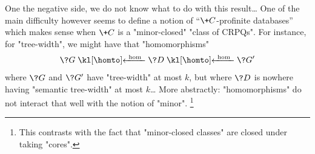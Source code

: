 One the negative side, we do not know what to do with this result…
One of the main difficulty however seems to define a notion of
``$\+C$-profinite databases'' which makes sense when $\+C$ is a "minor-closed" "class of CRPQs".
For instance, for "tree-width", we might have that "homomorphisms"
\[
	\?G \cohomto \?D \cohomto \?G'
\]
where $\?G$ and $\?G'$ have "tree-width" at most $k$,
but where $\?D$ is nowhere having "semantic tree-width" at most $k$…
More abstractly: "homomorphisms" do not interact that well with the notion of "minor".%
\footnote{This contrasts with the fact that "minor-closed classes" are closed under taking "cores".}

\clearpage
\begin{subappendices}
	
\end{subappendices}